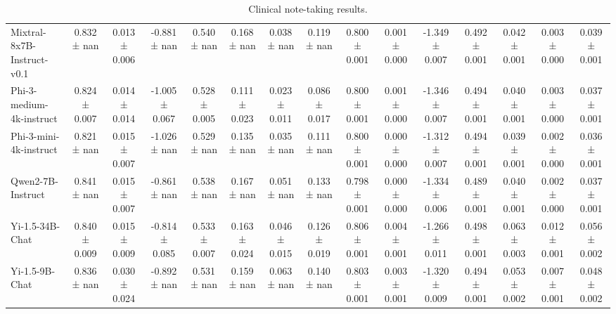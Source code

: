 \begin{table*}[h]
{\begin{tabular}{l|ccccccc|ccccccc}
Mixtral-8x7B-Instruct-v0.1 & 0.832  ± nan	 &  0.013  ± 0.006	&  -0.881  ± nan & 0.540  ± nan & 0.168  ± nan	& 0.038  ± nan	& 0.119  ± nan & 0.800  ± 0.001	& 0.001  ± 0.000	& -1.349  ± 0.007 & 0.492  ± 0.001
 & 0.042  ± 0.001 & 0.003  ± 0.000	& 0.039  ± 0.001 \\
Phi-3-medium-4k-instruct & 0.824 ± 0.007 & 0.014 ± 0.014 & -1.005 ± 0.067 & 0.528 ± 0.005 & 0.111 ± 0.023 & 0.023 ± 0.011 & 0.086 ± 0.017 & 0.800 ± 0.001 & 0.001 ± 0.000 & -1.346 ± 0.007 & 0.494 ± 0.001 & 0.040 ± 0.001 & 0.003 ± 0.000 & 0.037 ± 0.001 \\
Phi-3-mini-4k-instruct & 0.821 ± nan & 0.015 ± 0.007 & -1.026 ± nan & 0.529 ± nan & 0.135 ± nan & 0.035 ± nan & 0.111 ± nan & 0.800 ± 0.001 & 0.000 ± 0.000 & -1.312 ± 0.007 & 0.494 ± 0.001 & 0.039 ± 0.001 & 0.002 ± 0.000 & 0.036 ± 0.001 \\
Qwen2-7B-Instruct & 0.841 ± nan & 0.015 ± 0.007 & -0.861 ± nan & 0.538 ± nan & 0.167 ± nan & 0.051 ± nan & 0.133 ± nan & 0.798 ± 0.001 & 0.000 ± 0.000 & -1.334 ± 0.006 & 0.489 ± 0.001 & 0.040 ± 0.001 & 0.002 ± 0.000 & 0.037 ± 0.001 \\
Yi-1.5-34B-Chat & 0.840 ± 0.009 & 0.015 ± 0.009 & -0.814 ± 0.085 & 0.533 ± 0.007 & 0.163 ± 0.024 & 0.046 ± 0.015 & 0.126 ± 0.019 & 0.806 ± 0.001 & 0.004 ± 0.001 & -1.266 ± 0.011 & 0.498 ± 0.001 & 0.063 ± 0.003 & 0.012 ± 0.001 & 0.056 ± 0.002 \\
Yi-1.5-9B-Chat & 0.836 ± nan & 0.030 ± 0.024 & -0.892 ± nan & 0.531 ± nan & 0.159 ± nan & 0.063 ± nan & 0.140 ± nan & 0.803 ± 0.001 & 0.003 ± 0.001 & -1.320 ± 0.009 & 0.494 ± 0.001 & 0.053 ± 0.002 & 0.007 ± 0.001 & 0.048 ± 0.002 \\
\bottomrule
\end{tabular}%
}
\caption{Clinical note-taking results.}
\label{tab:evaluation_results}
\end{table*}